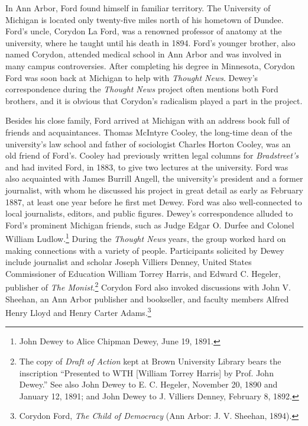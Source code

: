\documentclass[twoside,symmetric,nobib,justified]{tufte-book}
\begin{document}
In Ann Arbor, Ford found himself in familiar territory. The University
of Michigan is located only twenty-five miles north of his hometown of
Dundee. Ford's uncle, Corydon La Ford, was a renowned professor of
anatomy at the university, where he taught until his death in 1894.
Ford's younger brother, also named Corydon, attended medical school in
Ann Arbor and was involved in many campus controversies. After
completing his degree in Minnesota, Corydon Ford was soon back at
Michigan to help with \emph{Thought News}. Dewey's correspondence during
the \emph{Thought News} project often mentions both Ford brothers, and
it is obvious that Corydon's radicalism played a part in the project.

Besides his close family, Ford arrived at Michigan with an address book
full of friends and acquaintances. Thomas McIntyre Cooley, the long-time
dean of the university's law school and father of sociologist Charles
Horton Cooley, was an old friend of Ford's. Cooley had previously
written legal columns for \emph{Bradstreet's} and had invited Ford, in
1883, to give two lectures at the university. Ford was also acquainted
with James Burrill Angell, the university's president and a former
journalist, with whom he discussed his project in great detail as early
as February 1887, at least one year before he first met Dewey. Ford was
also well-connected to local journalists, editors, and public figures.
Dewey's correspondence alluded to Ford's prominent Michigan friends,
such as Judge Edgar O. Durfee and Colonel William Ludlow.\footnote{John
  Dewey to Alice Chipman Dewey, June 19, 1891.} During the \emph{Thought
News} years, the group worked hard on making connections with a variety
of people. Participants solicited by Dewey include journalist and
scholar Joseph Villiers Denney, United States Commissioner of Education
William Torrey Harris, and Edward C. Hegeler, publisher of \emph{The
Monist}.\footnote{The copy of \emph{Draft of Action} kept at Brown
  University Library bears the inscription ``Presented to WTH {[}William
  Torrey Harris{]} by Prof. John Dewey.'' See also John Dewey to E. C.
  Hegeler, November 20, 1890 and January 12, 1891; and John Dewey to J.
  Villiers Denney, February 8, 1892.} Corydon Ford also invoked
discussions with John V. Sheehan, an Ann Arbor publisher and bookseller,
and faculty members Alfred Henry Lloyd and Henry Carter
Adams.\footnote{Corydon Ford, \emph{The Child of Democracy} (Ann Arbor:
  J. V. Sheehan, 1894).}
\end{document}
